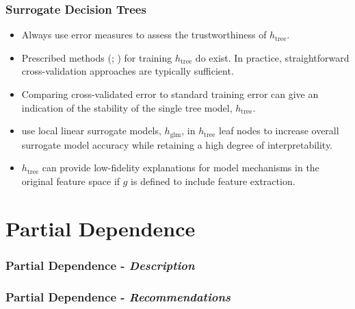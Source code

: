 \documentclass[11pt, 
               aspectratio=169]{beamer}
\begin{document}
	\begin{frame}
	
		\frametitle{Surrogate Decision Trees}
		
		\vspace{-10 pt}
		
		\begin{itemize}
			
			\item Always use error measures to assess the trustworthiness of $h_{\text{tree}}$.

			\item Prescribed methods (\cite{dt_surrogate1}; \cite{dt_surrogate2}) for training $h_{\text{tree}}$ do exist. In practice, straightforward cross-validation approaches are typically sufficient. 
			
			\item Comparing cross-validated error to standard training error can give an indication of the stability of the single tree model, $h_{\text{tree}}$.
			
			\item \cite{lime-sup} use local linear surrogate models, $h_{\text{glm}}$, in $h_{\text{tree}}$ leaf nodes to increase overall surrogate model accuracy while retaining a high degree of interpretability.

			\item $h_{\text{tree}}$ can provide low-fidelity explanations for model mechanisms in the original feature space if $g$ is defined to include feature extraction.
			
		\end{itemize}
		
	\end{frame}


	\section{Partial Dependence}

	\begin{frame}
		\frametitle{Partial Dependence - \textit{Description}}
	\end{frame}

	\begin{frame}
		\frametitle{Partial Dependence - \textit{Recommendations}}
	\end{frame}
\end{document}
